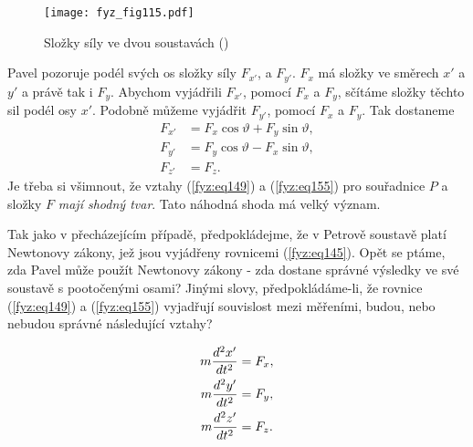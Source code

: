     \begin{figure}[ht!]  %
      \centering
      \texttt{[image: fyz\_fig115.pdf]}
      \caption{Složky síly ve dvou soustavách
              (\cite[s.~157]{Feynman01})}
      \label{fyz:fig115}
    \end{figure}

    Pavel pozoruje podél svých os složky síly \(F_{x'}\), a \(F_{y'}\). \(F_{x}\) má složky ve 
    směrech \(x'\) a \(y'\) a právě tak i \(F_y\). Abychom vyjádřili \(F_{x'}\), pomocí \(F_x\) a 
    \(F_y\), sčítáme složky těchto sil podél osy \(x'\). Podobně můžeme vyjádřit \(F_{y'}\), pomocí 
    \(F_x\) a \(F_y\). Tak dostaneme
    \begin{subequations}\label{fyz:eq155}
      \begin{align}
        F_{x'} &= F_x\cos\vartheta + F_y\sin\vartheta, \label{fyz:eq155a}\\
        F_{y'} &= F_y\cos\vartheta - F_x\sin\vartheta, \label{fyz:eq155b}\\
        F_{z'} &= F_z.                                 \label{fyz:eq155c}
      \end{align}
    \end{subequations}
    Je třeba si všimnout, že vztahy (\ref{fyz:eq149}) a (\ref{fyz:eq155}) pro souřadnice \(P\) a 
    složky \(F\) \emph{mají shodný tvar}. Tato náhodná shoda má velký význam.
    
    Tak jako v přecházejícím případě, předpokládejme, že v Petrově soustavě platí Newtonovy zákony, 
    jež jsou vyjádřeny rovnicemi (\ref{fyz:eq145}). Opět se ptáme, zda Pavel může použít Newtonovy 
    zákony - zda dostane správné výsledky ve své soustavě s pootočenými osami? Jinými slovy, 
    předpokládáme-li, že rovnice (\ref{fyz:eq149}) a (\ref{fyz:eq155}) vyjadřují souvislost mezi 
    měřeními, budou, nebo nebudou správné následující vztahy?
    
    \begin{subequations}\label{fyz:eq156}
      \begin{align}
        m\dfrac{d^2 x'}{d t^2} &= F_{x}, \label{fyz:eq156a}  \\
        m\dfrac{d^2 y'}{d t^2} &= F_{y}, \label{fyz:eq156b}  \\
        m\dfrac{d^2 z'}{d t^2} &= F_{z}. \label{fyz:eq156c}
      \end{align}
    \end{subequations}
    
